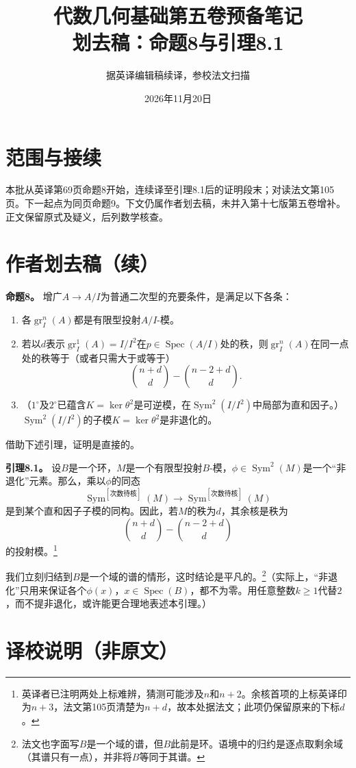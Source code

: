 \documentclass[openany,fontset=fandol]{ctexbook}
\newcommand{\Sym}{\operatorname{Sym}}
\newcommand{\gr}{\operatorname{gr}}
\begin{document}
\title{代数几何基础第五卷预备笔记\\划去稿：命题8与引理8.1}
\author{据英译编辑稿续译，参校法文扫描}
\date{2026年11月20日}
\maketitle
\chapter*{范围与接续}
本批从英译第69页命题8开始，连续译至引理8.1后的证明段末；对读法文第105页。下一起点为同页命题9。下文仍属作者划去稿，未并入第十七版第五卷增补。正文保留原式及疑义，后列数学核查。
\chapter*{作者划去稿（续）}
\noindent\textbf{命题8。}
增广$A\to A/I$为普通二次型的充要条件，是满足以下各条：
\begin{enumerate}
\item[$1^\circ$] 各$\gr_I^n(A)$都是有限型投射$A/I$-模。
\item[$2^\circ$] 若以$d$表示$\gr_I^1(A)=I/I^2$在$p\in\operatorname{Spec}(A/I)$处的秩，则$\gr_I^n(A)$在同一点处的秩等于（或者只需大于或等于）
\[
\binom{n+d}{d}-\binom{n-2+d}{d}.
\]
\item[$3^\circ$] （$1^\circ$及$2^\circ$已蕴含$K=\ker\theta^2$是可逆模，在$\Sym^2(I/I^2)$中局部为直和因子。）$\Sym^2(I/I^2)$的子模$K=\ker\theta^2$是非退化的。
\end{enumerate}

借助下述引理，证明是直接的。

\noindent\textbf{引理8.1。}
设$B$是一个环，$M$是一个有限型投射$B$-模，$\phi\in\Sym^2(M)$是一个“非退化”元素。那么，乘以$\phi$的同态
\[
\Sym^{[\text{次数待核}]}(M)\longrightarrow
\Sym^{[\text{次数待核}]}(M)
\]
是到某个直和因子子模的同构。因此，若$M$的秩为$d$，其余核是秩为
\[
\binom{n+d}{d}-\binom{n-2+d}{d}
\]
的投射模。\footnote{英译者已注明两处上标难辨，猜测可能涉及$n$和$n+2$。余核首项的上标英译印为$n+3$，法文第105页清楚为$n+d$，故本处据法文；此项仍保留原来的下标$d$。}

我们立刻归结到$B$是一个域的谱的情形，这时结论是平凡的。\footnote{法文也字面写$B$是一个域的谱，但$B$此前是环。语境中的归约是逐点取剩余域（其谱只有一点），并非将$B$等同于其谱。}（实际上，“非退化”只用来保证各个$\phi(x)$，$x\in\operatorname{Spec}(B)$，都不为零。用任意整数$k\ge1$代替$2$，而不提非退化，或许能更合理地表述本引理。）
\chapter*{译校说明（非原文）}
\end{document}
